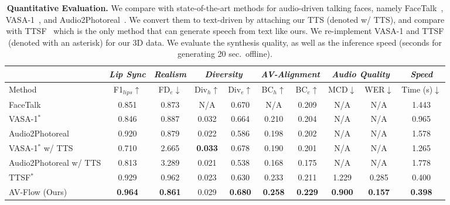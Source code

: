 \begin{table*}
  \centering
  \begin{tabular}{@{}l|ccccccccc@{}}
    \toprule
    & \textit{Lip Sync} & \multicolumn{1}{c}{\textit{Realism}} & \multicolumn{2}{c}{\textit{Diversity}} & \multicolumn{2}{c}{\textit{AV-Alignment}} & \multicolumn{2}{c}{\textit{Audio Quality}} & {\textit{Speed}} \\
    \midrule
    Method & F1$_{lips}$$\uparrow$ & FD$_{e}$$\downarrow$ & Div$_{h}$$\uparrow$ & Div$_{e}$$\uparrow$ & BC$_{h}$$\uparrow$ & BC$_{e}$$\uparrow$ & MCD$\downarrow$ & WER$\downarrow$ & Time (s)$\downarrow$ \\
    \midrule
    FaceTalk & 0.851 & 0.873 & N/A & 0.670 & N/A & 0.209 & N/A & N/A & 1.443 \\
    VASA-1$^{*}$ & 0.846 & 0.887 & 0.032 & 0.664 & 0.210 & 0.204 & N/A & N/A & 0.965 \\
    Audio2Photoreal & 0.920 & 0.879 & 0.022 & 0.586 & 0.198 & 0.202 & N/A & N/A & 1.578 \\
    \midrule
    VASA-1$^{*}$ w/ TTS & 0.710 & 2.665 & \textbf{0.033} & 0.678 & 0.190 & 0.201 & N/A & N/A & 1.265 \\
    Audio2Photoreal w/ TTS & 0.813 & 3.289 & 0.021 & 0.538 & 0.168 & 0.175 & N/A & N/A & 1.778\\
    TTSF$^{*}$ & 0.929 & 0.962 & 0.023 & 0.630 & 0.233 & 0.211 & 1.229 & 0.285 & 0.400  \\
    \midrule
    AV-Flow (Ours) & \textbf{0.964} & \textbf{0.861} & 0.029 & \textbf{0.680} & \textbf{0.258} & \textbf{0.229} & \textbf{0.900} & \textbf{0.157} & \textbf{0.398} \\
    \bottomrule
  \end{tabular}
  \caption{\textbf{Quantitative Evaluation.} We compare with state-of-the-art methods for audio-driven talking faces, namely FaceTalk~\cite{aneja2023facetalk}, VASA-1~\cite{xu2024vasa}, and Audio2Photoreal~\cite{ng2024audio2photoreal}. We convert them to text-driven by attaching our TTS (denoted w/ TTS), and compare with TTSF~\cite{Jang_2024_CVPR} which is the only method that can generate speech from text like ours. We re-implement VASA-1 and TTSF (denoted with an asterisk) for our 3D data.  We evaluate the synthesis quality, as well as the inference speed (seconds for generating 20 sec.~offline).}
  \label{tab:quant_results}
  \vspace{-10pt}
\end{table*}


